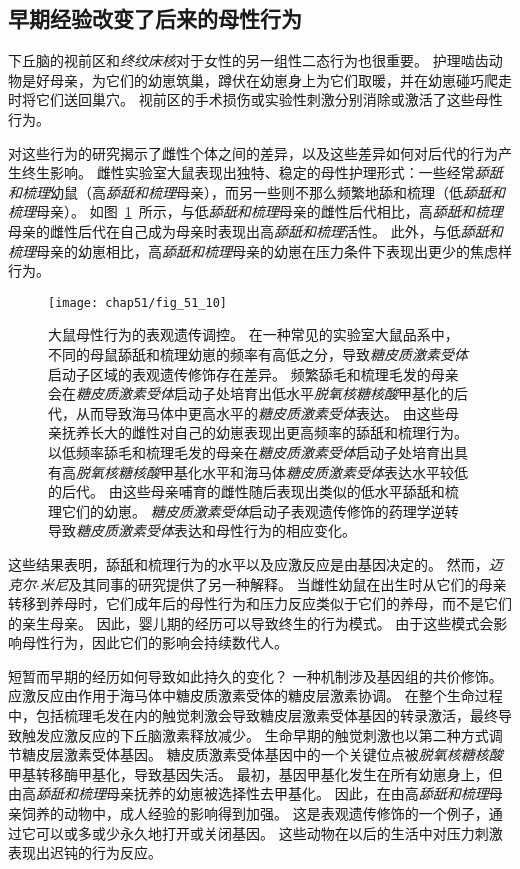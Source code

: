\subsection{早期经验改变了后来的母性行为}

下丘脑的视前区和\textit{终纹床核}对于女性的另一组性二态行为也很重要。
护理啮齿动物是好母亲，为它们的幼崽筑巢，蹲伏在幼崽身上为它们取暖，并在幼崽碰巧爬走时将它们送回巢穴。
视前区的手术损伤或实验性刺激分别消除或激活了这些母性行为。


对这些行为的研究揭示了雌性个体之间的差异，以及这些差异如何对后代的行为产生终生影响。
雌性实验室大鼠表现出独特、稳定的母性护理形式：一些经常\textit{舔舐和梳理}幼鼠（高\textit{舔舐和梳理}母亲），而另一些则不那么频繁地舔和梳理（低\textit{舔舐和梳理}母亲）。
如图~\ref{fig:51_10}~所示，与低\textit{舔舐和梳理}母亲的雌性后代相比，高\textit{舔舐和梳理}母亲的雌性后代在自己成为母亲时表现出高\textit{舔舐和梳理}活性。
此外，与低\textit{舔舐和梳理}母亲的幼崽相比，高\textit{舔舐和梳理}母亲的幼崽在压力条件下表现出更少的焦虑样行为。


\begin{figure}[htbp]
	\centering
	\texttt{[image: chap51/fig\_51\_10]}
	\caption{大鼠母性行为的表观遗传调控。
		在一种常见的实验室大鼠品系中，不同的母鼠舔舐和梳理幼崽的频率有高低之分，导致\textit{糖皮质激素受体}启动子区域的表观遗传修饰存在差异。
		频繁舔毛和梳理毛发的母亲会在\textit{糖皮质激素受体}启动子处培育出低水平\textit{脱氧核糖核酸}甲基化的后代，从而导致海马体中更高水平的\textit{糖皮质激素受体}表达。
		由这些母亲抚养长大的雌性对自己的幼崽表现出更高频率的舔舐和梳理行为。
		以低频率舔毛和梳理毛发的母亲在\textit{糖皮质激素受体}启动子处培育出具有高\textit{脱氧核糖核酸}甲基化水平和海马体\textit{糖皮质激素受体}表达水平较低的后代。
		由这些母亲哺育的雌性随后表现出类似的低水平舔舐和梳理它们的幼崽。
		\textit{糖皮质激素受体}启动子表观遗传修饰的药理学逆转导致\textit{糖皮质激素受体}表达和母性行为的相应变化\cite{sapolsky2004mothering}。}
	\label{fig:51_10}
\end{figure}


这些结果表明，舔舐和梳理行为的水平以及应激反应是由基因决定的。
然而，\textit{迈克尔$\cdot$米尼}及其同事的研究提供了另一种解释。
当雌性幼鼠在出生时从它们的母亲转移到养母时，它们成年后的母性行为和压力反应类似于它们的养母，而不是它们的亲生母亲。
因此，婴儿期的经历可以导致终生的行为模式。
由于这些模式会影响母性行为，因此它们的影响会持续数代人。


短暂而早期的经历如何导致如此持久的变化？
一种机制涉及基因组的共价修饰。
应激反应由作用于海马体中糖皮质激素受体的糖皮层激素协调。
在整个生命过程中，包括梳理毛发在内的触觉刺激会导致糖皮层激素受体基因的转录激活，最终导致触发应激反应的下丘脑激素释放减少。
生命早期的触觉刺激也以第二种方式调节糖皮层激素受体基因。
糖皮质激素受体基因中的一个关键位点被\textit{脱氧核糖核酸}甲基转移酶甲基化，导致基因失活。
最初，基因甲基化发生在所有幼崽身上，但由高\textit{舔舐和梳理}母亲抚养的幼崽被选择性去甲基化。
因此，在由高\textit{舔舐和梳理}母亲饲养的动物中，成人经验的影响得到加强。
这是表观遗传修饰的一个例子，通过它可以或多或少永久地打开或关闭基因。
这些动物在以后的生活中对压力刺激表现出迟钝的行为反应。


